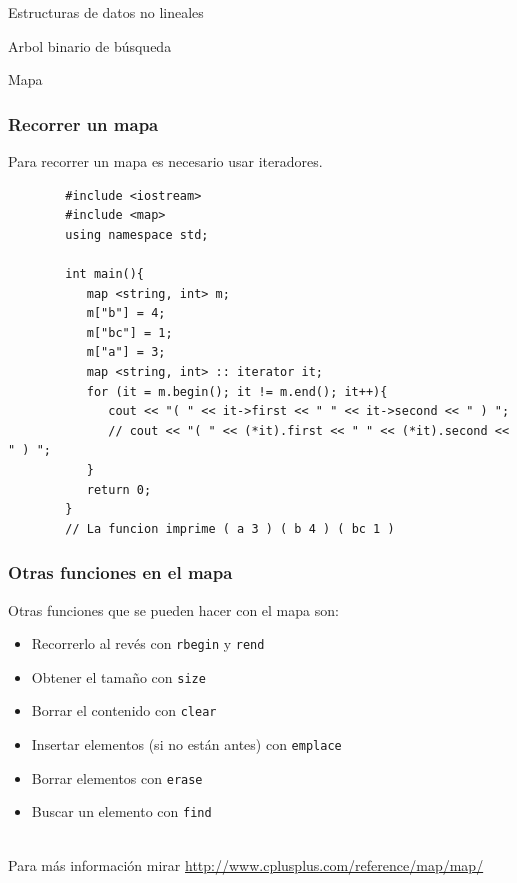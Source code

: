 \documentclass{beamer}
\begin{document}
\begin{section}{Estructuras de datos no lineales}
\begin{subsection}{Arbol binario de búsqueda}
\begin{subsubsection}{Mapa}
	\begin{frame}[fragile]
		\frametitle{Recorrer un mapa}
		Para recorrer un mapa es necesario usar iteradores.\\
		\begin{lstlisting}
		#include <iostream>
		#include <map>
		using namespace std;

		int main(){
		   map <string, int> m;
		   m["b"] = 4;
		   m["bc"] = 1;
		   m["a"] = 3;
		   map <string, int> :: iterator it;
		   for (it = m.begin(); it != m.end(); it++){
		      cout << "( " << it->first << " " << it->second << " ) ";
		      // cout << "( " << (*it).first << " " << (*it).second << " ) ";
		   }
		   return 0;
		}
		// La funcion imprime ( a 3 ) ( b 4 ) ( bc 1 )
		\end{lstlisting}
	\end{frame}
	
	\begin{frame}[fragile]
		\frametitle{Otras funciones en el mapa}
		Otras funciones que se pueden hacer con el mapa son:\\
		\begin{itemize}
			\item Recorrerlo al revés con \verb|rbegin| y \verb|rend|
			\item Obtener el tamaño con \verb|size|
			\item Borrar el contenido con \verb|clear|
			\item Insertar elementos (si no están antes) con \verb|emplace|
			\item Borrar elementos con \verb|erase|
			\item Buscar un elemento con \verb|find|
		\end{itemize}
		\quad \\
		Para más información mirar \url{http://www.cplusplus.com/reference/map/map/}
	\end{frame}
\end{subsubsection}



\end{subsection}
\end{section}
\end{document}
